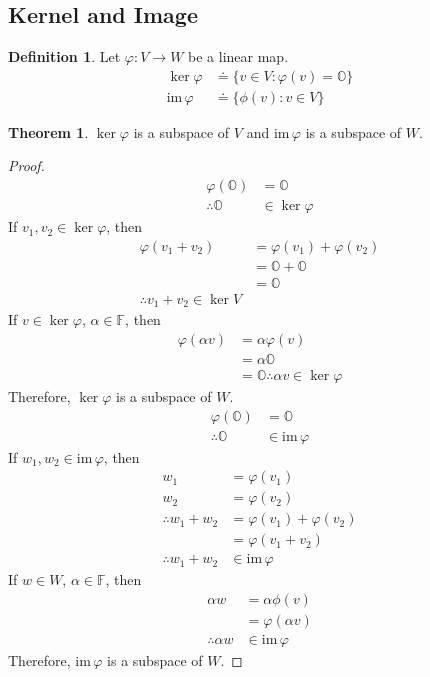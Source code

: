 \documentclass[fleqn, a4paper, 12pt]{article}
\theoremstyle{definition}
\newtheorem{definition}{Definition} %
\theoremstyle{theorem}
\newtheorem{theorem}{Theorem} %
\theoremstyle{remark}
\newcommand{\im}{\mathrm{im}\,}
\numberwithin{equation}{theorem}
\begin{document}
\subsection{Kernel and Image}

\begin{definition}
	Let $\varphi : V \to W$ be a linear map.
	\begin{align*}
		\ker \varphi &\doteq \{v \in V : \varphi (v) = \mathbb{O}\}\\
		\im \varphi &\doteq \{\phi (v) : v \in V\}
	\end{align*}
\end{definition}

\begin{theorem}
	$\ker \varphi$ is a subspace of $V$ and $\im \varphi$ is a subspace of $W$.
\end{theorem}

\begin{proof}
	\begin{align*}
		\varphi (\mathbb{O}) &= \mathbb{O}\\
		\therefore \mathbb{O} &\in \ker \varphi
	\end{align*}
	If $v_1, v_2 \in \ker \varphi$, then
	\begin{align*}
		\varphi (v_1 + v_2) &= \varphi (v_1) + \varphi (v_2)\\
		&= \mathbb{O} + \mathbb{O}\\
		&= \mathbb{O}\\
		\therefore v_1 + v_2 \in \ker V
	\end{align*}
	If $v \in \ker \varphi$, $\alpha \in \mathbb{F}$, then
	\begin{align*}
		\varphi (\alpha v) &= \alpha \varphi (v)\\
		&= \alpha \mathbb{O} \\
		&= \mathbb{O}
		\therefore \alpha v \in \ker \varphi
	\end{align*}
	Therefore, $\ker \varphi$ is a subspace of $W$.\\
	\begin{align*}
		\varphi (\mathbb{O}) &= \mathbb{O}\\
		\therefore \mathbb{O} &\in \im \varphi
	\end{align*}
	If $w_1, w_2 \in \im \varphi$, then
	\begin{align*}
		w_1 &= \varphi (v_1)\\
		w_2 &= \varphi (v_2)\\
		\therefore w_1 + w_2 &= \varphi (v_1) + \varphi (v_2)\\
		&= \varphi (v_1 + v_2)\\
		\therefore w_1 + w_2 &\in \im \varphi
	\end{align*}
	If $w \in W$, $\alpha \in \mathbb{F}$, then
	\begin{align*}
		\alpha w &= \alpha \phi (v)\\
		&= \varphi (\alpha v)\\
		\therefore \alpha w &\in \im \varphi
	\end{align*}
	Therefore, $\im \varphi$ is a subspace of $W$.
\end{proof}
\end{document}

